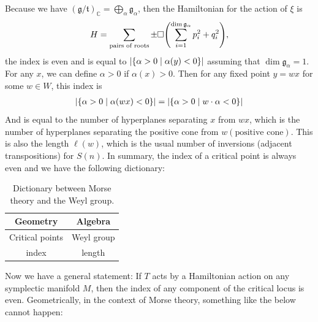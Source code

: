 \documentclass[leqno, openany]{memoir}
\theoremstyle{definition}
\theoremstyle{remark}
\theoremstyle{plain}
\theoremstyle{definition}
\theoremstyle{remark}
\newcommand{\C}{\mathbb{C}}
\newcommand{\mf}[1]{\mathfrak{#1}}
\begin{document}
Because we have $(\mf{g}/\mf{t})_{\C} = \bigoplus_{\alpha} \mf{g}_{\alpha}$, then the Hamiltonian for the action of $\xi$ is
\[ H = \sum_{\text{pairs of roots}} \pm \square \qty(\sum_{i=1}^{\dim \mf{g}_{\alpha}} p_i^2 + q_i^2 ), \]
the index is even and is equal to $\abs{ \qty{\alpha > 0 \mid \alpha(y) < 0} }$ assuming that $\dim \mf{g}_{\alpha} = 1$. For any $x$, we can define $\alpha > 0$ if $\alpha(x) > 0$. Then for any fixed point $y = w x$ for some $w \in W$, this index is 
\begin{align*}
    \abs{\qty{\alpha > 0 \mid \alpha(wx) < 0}} &= \abs{\qty{\alpha > 0 \mid w \cdot \alpha < 0}} \\
\end{align*}
And is equal to the number of hyperplanes separating $x$ from $wx$, which is the number of hyperplanes separating the positive cone from $w(\text{positive cone})$. This is also the length $\ell(w)$, which is the usual number of inversions (adjacent transpositions) for $S(n)$. In summary, the index of a critical point is always even and we have the following dictionary:
\begin{table}[H]
    \centering
    \caption{Dictionary between Morse theory and the Weyl group.}%
    \label{tab:morse-weyl-dictionary}
    \begin{tabular}{cc}
    \toprule
    Geometry & Algebra \\
    \midrule
    Critical points & Weyl group \\
    index & length \\
    \bottomrule
    \end{tabular}
\end{table}
Now we have a general statement: If $T$ acts by a Hamiltonian action on any symplectic manifold $M$, then the index of any component of the critical locus is even. Geometrically, in the context of Morse theory, something like the below cannot happen:
\end{document}
